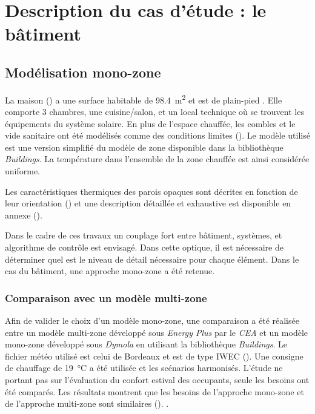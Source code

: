 \section{Description du cas d’étude : le bâtiment} %
\label{sec:description_du_cas_d_etude_le_batiment}
\subsection{Modélisation mono-zone} %
\label{sub:modelisation_monozone}
La maison () a une surface habitable de \SI{98.4}{\meter\squared}
et est de plain-pied .
Elle comporte 3 chambres, une cuisine/salon, et un local technique où se
trouvent les équipements du système solaire.
En plus de l’espace chauffée, les combles et le vide sanitaire ont été modélisés
comme des conditions limites (). Le modèle utilisé est une version
simplifié du modèle de zone disponible dans la bibliothèque \textit{Buildings}.
La température dans l’ensemble de la zone chauffée est ainsi considérée uniforme.

Les caractéristiques thermiques des parois opaques sont décrites en fonction de
leur orientation () et une description détaillée et exhaustive est
disponible en annexe ().

Dans le cadre de ces travaux un couplage fort entre bâtiment, systèmes, et algorithme
de contrôle est envisagé. Dans cette optique, il est nécessaire de déterminer quel
est le niveau de détail nécessaire pour chaque élément. Dans le cas du bâtiment, une
approche mono-zone a été retenue.


\subsubsection{Comparaison avec un modèle multi-zone} %
\label{ssub:comparaison_avec_un_modele_multi_zone}
Afin de valider le choix d’un modèle mono-zone, une comparaison a été réalisée
entre un modèle multi-zone développé sous \textit{Energy Plus} par le
\textit{CEA} et un modèle mono-zone développé sous \textit{Dymola} en utilisant
la bibliothèque \textit{Buildings}. Le fichier météo utilisé est celui de
Bordeaux et est de type IWEC (). Une
consigne de chauffage de \SI{19}{\celsius} a été utilisée et les scénarios
harmonisés. L’étude ne portant pas sur l’évaluation du confort estival des
occupants, seule les besoins ont été comparés. Les résultats montrent que les
besoins de l’approche mono-zone et de l’approche multi-zone sont similaires
().
.



